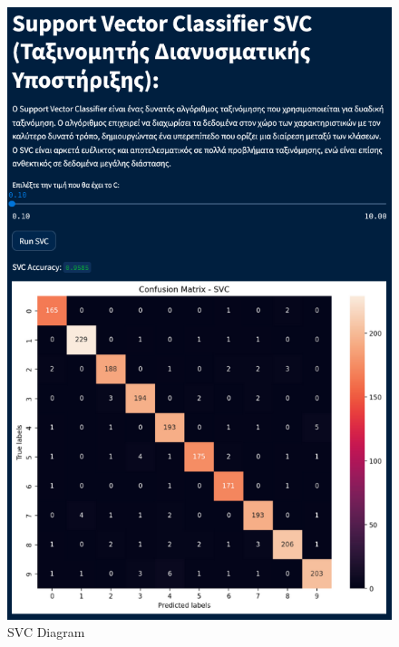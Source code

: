 \documentclass[unnumsec,webpdf,contemporary,large]{oup-authoring-template}%
\theoremstyle{thmstyleone}%
\theoremstyle{thmstyletwo}%
\theoremstyle{thmstylethree}%
\begin{document}
\begin{figure}
    \centering
    \includegraphics[width=1\linewidth]{images/svc.png}
    \caption{SVC Diagram}
    \label{fig:svc}
\end{figure}
\end{document}
